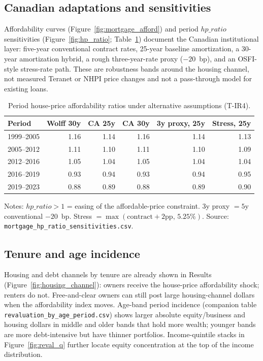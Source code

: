 \documentclass[11pt]{article}
\begin{document}
\subsection{Canadian adaptations and sensitivities}

Affordability curves (Figure~\ref{fig:mortgage_afford}) and period $hp\_ratio$ sensitivities (Figure~\ref{fig:hp_ratio}; Table~\ref{tab:ir4}) document the Canadian institutional layer: five-year conventional contract rates, 25-year baseline amortization, a 30-year amortization hybrid, a rough three-year-rate proxy ($-20$~bp), and an OSFI-style stress-rate path. These are robustness bands around the housing channel, not measured Teranet or NHPI price changes and not a pass-through model for existing loans.

\begin{table}[ht]
\centering
\caption{Period house-price affordability ratios under alternative assumptions (T-IR4).}
\label{tab:ir4}
\small
\begin{tabular}{lrrrrr}
\toprule
Period & Wolff 30y & CA 25y & CA 30y & 3y proxy, 25y & Stress, 25y \\
\midrule
1999--2005 & 1.16 & 1.14 & 1.16 & 1.14 & 1.13 \\
2005--2012 & 1.11 & 1.10 & 1.11 & 1.10 & 1.09 \\
2012--2016 & 1.05 & 1.04 & 1.05 & 1.04 & 1.04 \\
2016--2019 & 0.93 & 0.94 & 0.93 & 0.94 & 0.95 \\
2019--2023 & 0.88 & 0.89 & 0.88 & 0.89 & 0.90 \\
\bottomrule
\end{tabular}
\par\smallskip
\begin{minipage}{0.95\textwidth}
\footnotesize Notes: $hp\_ratio>1$ = easing of the affordable-price constraint. 3y proxy $=5$y conventional $-20$~bp. Stress $=\max(\mathrm{contract}+2\mathrm{pp},\,5.25\%)$. Source: \texttt{mortgage\_hp\_ratio\_sensitivities.csv}.
\end{minipage}
\end{table}

\subsection{Tenure and age incidence}

Housing and debt channels by tenure are already shown in Results (Figure~\ref{fig:housing_channel}): owners receive the house-price affordability shock; renters do not. Free-and-clear owners can still post large housing-channel dollars when the affordability index moves. Age-band period incidence (companion table \texttt{revaluation\_by\_age\_period.csv}) shows larger absolute equity/business and housing dollars in middle and older bands that hold more wealth; younger bands are more debt-intensive but have thinner portfolios. Income-quintile stacks in Figure~\ref{fig:reval_q} further locate equity concentration at the top of the income distribution.
\end{document}
